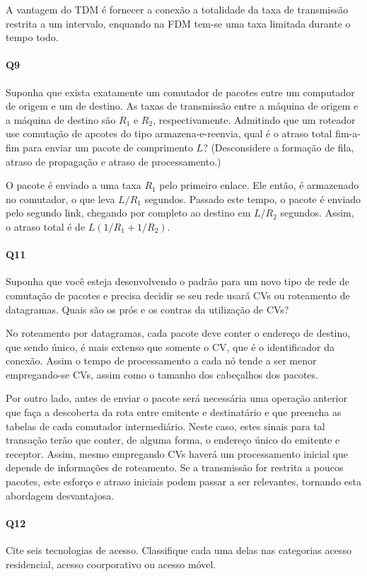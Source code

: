 A vantagem do TDM é fornecer a conexão a totalidade da taxa de transmissão restrita a um intervalo, enquando na FDM tem-se uma taxa limitada durante o tempo todo.

\paragraph{Q9}
Suponha que exista exatamente um comutador de pacotes entre um computador de origem e um de destino. As taxas de transmissão entre a máquina de origem e a máquina de destino são $R_1$ e $R_2$, respectivamente. Admitindo que um roteador use comutação de apcotes do tipo armazena-e-reenvia, qual é o atraso total fim-a-fim para enviar um pacote de comprimento $L$? (Desconsidere a formação de fila, atraso de propagação e atraso de processamento.)

O pacote é enviado a uma taxa $R_1$ pelo primeiro enlace. Ele então, é armazenado no comutador, o que leva $L/R_1$ segundos.
Passado este tempo, o pacote é enviado pelo segundo link, chegando por completo ao destino em $L/R_2$ segundos.
Assim, o atraso total é de $L(1/R_1 + 1/R_2)$.

\paragraph{Q11}
Suponha que você esteja desenvolvendo o padrão para um novo tipo de rede de comutação de pacotes e precisa decidir se seu rede usará CVs ou roteamento de datagramas. Quais são os prós e os contras da utilização de CVs?

No roteamento por datagramas, cada pacote deve conter o endereço de destino, que sendo único, é mais extenso que somente o CV, que é o identificador da conexão.
Assim o tempo de processamento a cada nó tende a ser menor empregando-se CVs, assim como o tamanho dos cabeçalhos dos pacotes.

Por outro lado, antes de enviar o pacote será necessária uma operação anterior que faça a descoberta da rota entre emitente e destinatário e que preencha as tabelas de cada comutador intermediário.
Neste caso, estes sinais para tal transação terão que conter, de alguma forma, o endereço único do emitente e receptor.
Assim, mesmo empregando CVs haverá um processamento inicial que depende de informações de roteamento.
Se a transmissão for restrita a poucos pacotes, este esforço e atraso iniciais podem passar a ser relevantes, tornando esta abordagem desvantajosa.

\paragraph{Q12}
Cite seis tecnologias de acesso. Classifique cada uma delas nas categorias acesso residencial, acesso coorporativo ou acesso móvel.

